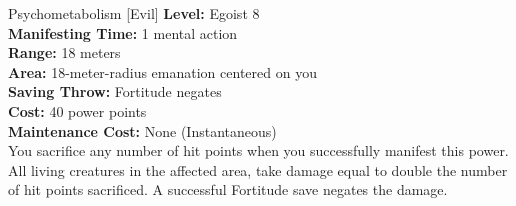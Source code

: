 {Psychometabolism [Evil]}
{
	\textbf{Level:}
	Egoist 8\\
	\textbf{Manifesting Time:}
	1 mental action\\
	\textbf{Range:}
	18 meters\\
	\textbf{Area:}
	18-meter-radius emanation centered on you\\
	\textbf{Saving Throw:}
	Fortitude negates\\
	\textbf{Cost:}
	40 power points\\
	\textbf{Maintenance Cost:}
	None (Instantaneous)\\
}
{
	You sacrifice any number of hit points when you successfully manifest this power. All living creatures in the affected area, take damage equal to double the number of hit points sacrificed. A successful Fortitude save negates the damage.
}